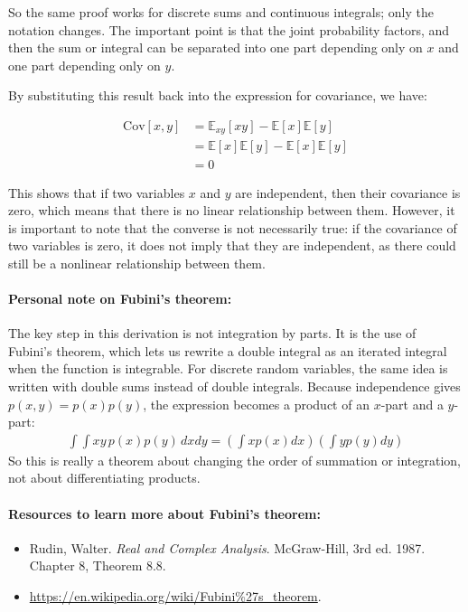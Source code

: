 \documentclass{article}
\begin{document}
\begin{tcolorbox}[breakable,colback=gray!5,colframe=gray!60,title=Solution]
So the same proof works for discrete sums and continuous integrals; only the notation changes.
The important point is that the joint probability factors, and then the sum or integral can
be separated into one part depending only on $x$ and one part depending only on $y$.
\par\medskip

By substituting this result back into the expression for covariance, we have:

\begin{align*}
  \text{Cov}[x, y] &= \mathbb{E}_{xy}[xy] - \mathbb{E}[x]\mathbb{E}[y] \\
  &= \mathbb{E}[x] \mathbb{E}[y] - \mathbb{E}[x]\mathbb{E}[y] \\
  &= 0
\end{align*}

This shows that if two variables $x$ and $y$ are independent, then their covariance 
is zero, which means that there is no linear relationship between them. 
However, it is important to note that the converse is not necessarily true: 
if the covariance of two variables is zero, it does not imply that they are independent, 
as there could still be a nonlinear relationship between them.

\paragraph{Personal note on Fubini's theorem:} The key step in this derivation is not integration by parts. 
It is the use of Fubini's theorem, which lets us rewrite a double integral as an iterated integral when the function is integrable. 
For discrete random variables, the same idea is written with double sums instead of double integrals. 
Because independence gives $p(x,y)=p(x)p(y)$, the expression becomes a product of an $x$-part and a $y$-part:
\begin{align*}
\int \int xy \, p(x) p(y) \, dx dy = \left( \int x p(x) dx \right) \left( \int y p(y) dy \right)
\end{align*}
So this is really a theorem about changing the order of summation or integration, not about differentiating products.

\paragraph{Resources to learn more about Fubini's theorem:}
\begin{itemize}
  \item Rudin, Walter. \textit{Real and Complex Analysis}. McGraw-Hill, 3rd ed. 1987. Chapter 8, Theorem 8.8.
  \item \url{https://en.wikipedia.org/wiki/Fubini\%27s_theorem}.
\end{itemize}

\end{tcolorbox}
\end{document}
